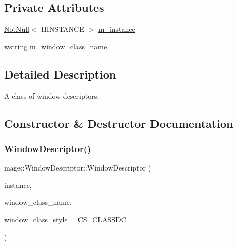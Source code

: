 \subsection*{Private Attributes}
\begin{DoxyCompactItemize}
\item 
\mbox{\hyperlink{namespacemage_a8769f9d670d6b585ea306cb1062af94b}{Not\+Null}}$<$ H\+I\+N\+S\+T\+A\+N\+CE $>$ \mbox{\hyperlink{classmage_1_1_window_descriptor_afa7ab62493d51db5d1ab6a4167f2da4a}{m\+\_\+instance}}
\item 
wstring \mbox{\hyperlink{classmage_1_1_window_descriptor_abd3379a435cfea7aae78f4989635bfb5}{m\+\_\+window\+\_\+class\+\_\+name}}
\end{DoxyCompactItemize}


\subsection{Detailed Description}
A class of window descriptors. 

\subsection{Constructor \& Destructor Documentation}
\mbox{\label{classmage_1_1_window_descriptor_af7a5263d567d320a2edd1420293d55e7}} 
\subsubsection{\texorpdfstring{Window\+Descriptor()}{WindowDescriptor()}\hspace{0.1cm}{\footnotesize\ttfamily [1/3]}}
{\footnotesize\ttfamily mage\+::\+Window\+Descriptor\+::\+Window\+Descriptor (\begin{DoxyParamCaption}\item[{\mbox{\hyperlink{namespacemage_a8769f9d670d6b585ea306cb1062af94b}{Not\+Null}}$<$ H\+I\+N\+S\+T\+A\+N\+CE $>$}]{instance,  }\item[{wstring}]{window\+\_\+class\+\_\+name,  }\item[{\mbox{\hyperlink{namespacemage_a41c104c036fba3756a74e19f793eeaa1}{U32}}}]{window\+\_\+class\+\_\+style = {\ttfamily CS\+\_\+CLASSDC} }\end{DoxyParamCaption})\hspace{0.3cm}{\ttfamily [explicit]}}

